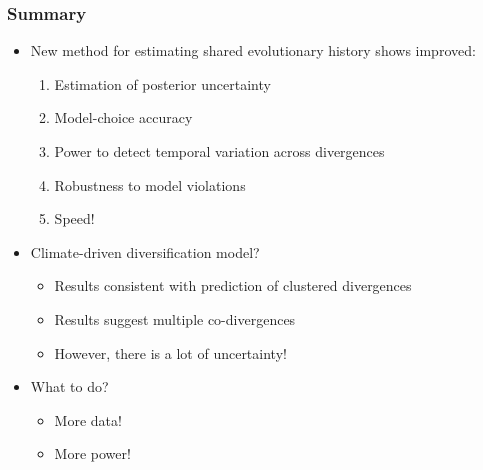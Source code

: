 \begin{frame}
    \frametitle{Summary}
    \begin{itemize}
        \item<1-> New method for estimating shared evolutionary history shows
            improved:
            \begin{enumerate}
                \item<2-> Estimation of posterior uncertainty
                \item<2-> Model-choice accuracy
                \item<2-> Power to detect temporal variation across divergences
                \item<2-> Robustness to model violations
                \item<2-> Speed!
            \end{enumerate}

        \smallskip
        \item<3-> Climate-driven diversification model?
            \begin{itemize}
                \item<4-> Results consistent with prediction of clustered
                    divergences
                \item<4-> Results suggest multiple co-divergences
                \item<4-> However, there is a lot of uncertainty!
            \end{itemize}

        \smallskip
        \item<5-> What to do?
            \begin{itemize}
                \item<6-> More data!
                \item<6-> More power! 
            \end{itemize}
    \end{itemize}
\end{frame}


